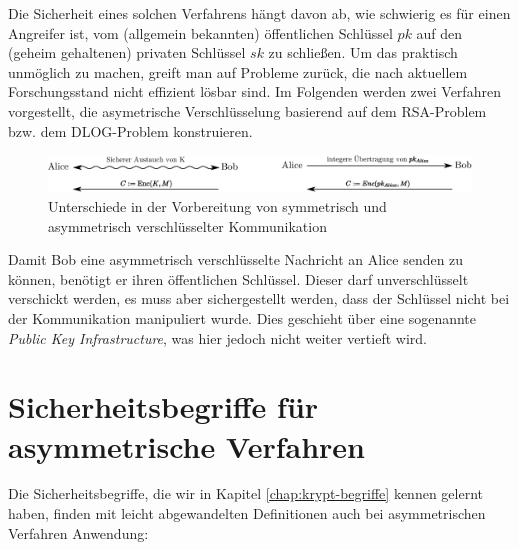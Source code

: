 Die Sicherheit eines solchen Verfahrens hängt davon ab, wie schwierig es
für einen Angreifer ist, vom (allgemein bekannten) öffentlichen
Schlüssel $pk$ auf den (geheim gehaltenen) privaten Schlüssel $sk$ zu
schließen. Um das praktisch unmöglich zu machen, greift man auf Probleme
zurück, die nach aktuellem Forschungsstand nicht effizient lösbar
sind. Im Folgenden werden zwei Verfahren vorgestellt, die asymetrische
Verschlüsselung basierend auf dem RSA-Problem bzw. dem DLOG-Problem
konstruieren. 

\begin{figure}
\includegraphics[width=\textwidth]{images/vergleich-symmetrisch-asymmetrisch.eps}
\caption{Unterschiede in der Vorbereitung von symmetrisch und
  asymmetrisch verschlüsselter Kommunikation}
\label{fig:asymmenc-symmenc}
\end{figure}
Damit Bob eine asymmetrisch verschlüsselte Nachricht an Alice senden zu
können, benötigt er ihren öffentlichen Schlüssel. Dieser darf
unverschlüsselt verschickt werden, es muss aber sichergestellt werden,
dass der Schlüssel nicht bei der Kommunikation manipuliert wurde. Dies
geschieht über eine sogenannte \textit{Public Key Infrastructure}, was
hier jedoch nicht weiter vertieft wird.
\section{Sicherheitsbegriffe für asymmetrische Verfahren}
Die Sicherheitsbegriffe, die wir in Kapitel \ref{chap:krypt-begriffe}
kennen gelernt haben, finden mit leicht abgewandelten Definitionen auch
bei asymmetrischen Verfahren Anwendung:

